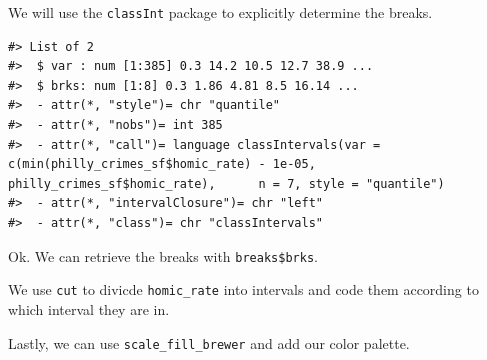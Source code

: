 \documentclass[
]{book}
\newenvironment{Shaded}{\begin{snugshade}}{\end{snugshade}}
\newcommand{\AttributeTok}[1]{\textcolor[rgb]{0.13,0.29,0.53}{#1}}
\newcommand{\CommentTok}[1]{\textcolor[rgb]{0.56,0.35,0.01}{\textit{#1}}}
\newcommand{\DecValTok}[1]{\textcolor[rgb]{0.00,0.00,0.81}{#1}}
\newcommand{\FunctionTok}[1]{\textcolor[rgb]{0.13,0.29,0.53}{\textbf{#1}}}
\newcommand{\NormalTok}[1]{#1}
\newcommand{\OtherTok}[1]{\textcolor[rgb]{0.56,0.35,0.01}{#1}}
\newcommand{\SpecialCharTok}[1]{\textcolor[rgb]{0.81,0.36,0.00}{\textbf{#1}}}
\newcommand{\StringTok}[1]{\textcolor[rgb]{0.31,0.60,0.02}{#1}}
\begin{document}
We will use the \texttt{classInt} package to explicitly determine the breaks.

\begin{Shaded}
\end{Shaded}

\begin{verbatim}
#> List of 2
#>  $ var : num [1:385] 0.3 14.2 10.5 12.7 38.9 ...
#>  $ brks: num [1:8] 0.3 1.86 4.81 8.5 16.14 ...
#>  - attr(*, "style")= chr "quantile"
#>  - attr(*, "nobs")= int 385
#>  - attr(*, "call")= language classIntervals(var = c(min(philly_crimes_sf$homic_rate) - 1e-05, philly_crimes_sf$homic_rate),      n = 7, style = "quantile")
#>  - attr(*, "intervalClosure")= chr "left"
#>  - attr(*, "class")= chr "classIntervals"
\end{verbatim}

Ok. We can retrieve the breaks with \texttt{breaks\$brks}.

We use \texttt{cut} to divicde \texttt{homic\_rate} into intervals and code them according to which interval they are in.

Lastly, we can use \texttt{scale\_fill\_brewer} and add our color palette.

\begin{Shaded}
\end{Shaded}
\end{document}
